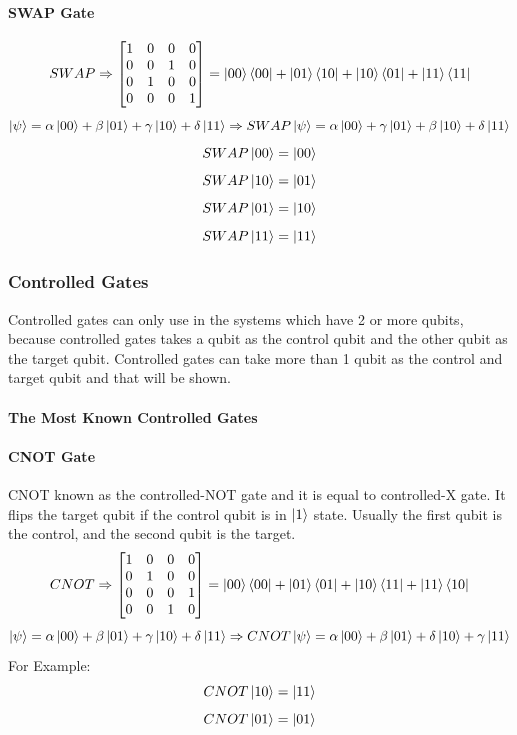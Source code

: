 \documentclass{article}
\begin{document}
\paragraph{SWAP Gate}
\begin{equation*}
    SWAP \Rightarrow \begin{bmatrix} 1 & 0 & 0 & 0 \\ 0 & 0 & 1 & 0 \\ 0 & 1 & 0 & 0 \\ 0 & 0 & 0 & 1 \end{bmatrix} = \ket{00}\bra{00}+\ket{01}\bra{10}+\ket{10}\bra{01}+\ket{11}\bra{11}
\end{equation*}
\begin{equation*}
    \ket{\psi} = \alpha\ket{00} + \beta\ket{01} + \gamma\ket{10} + \delta\ket{11} \Rightarrow SWAP\ket{\psi} = \alpha\ket{00} + \gamma\ket{01} + \beta\ket{10} + \delta\ket{11}
\end{equation*}
\vspace{0.5cm}
    $$SWAP\ket{00} = \ket{00}$$
    $$SWAP\ket{10} = \ket{01}$$
    $$SWAP\ket{01} = \ket{10}$$
    $$SWAP\ket{11} = \ket{11}$$
\subsubsection{Controlled Gates}
Controlled gates can only use in the systems which have 2 or more qubits, because controlled gates takes a qubit as the control qubit and the other qubit as the target qubit. Controlled gates can take more than 1 qubit as the control and target qubit and that will be shown.
\paragraph{The Most Known Controlled Gates}

\paragraph{CNOT Gate}
CNOT known as the controlled-NOT gate and it is equal to controlled-X gate. It flips the target qubit if the control qubit is in $\ket{1}$ state. Usually the first qubit is the control, and the second qubit is the target.
\begin{equation*}
    CNOT \Rightarrow \begin{bmatrix} 1 & 0 & 0 & 0 \\ 0 & 1 & 0 & 0 \\ 0 & 0 & 0 & 1 \\ 0 & 0 & 1 & 0 \end{bmatrix} = \ket{00}\bra{00}+\ket{01}\bra{01}+\ket{10}\bra{11}+\ket{11}\bra{10}
\end{equation*}
\begin{equation*}
        \ket{\psi} = \alpha\ket{00} + \beta\ket{01} + \gamma\ket{10} + \delta\ket{11} \Rightarrow CNOT\ket{\psi} = \alpha\ket{00} + \beta\ket{01} + \delta\ket{10} + \gamma\ket{11}
\end{equation*}
For Example: 
$$CNOT\ket{10} = \ket{11}$$
$$CNOT\ket{01} = \ket{01}$$
\end{document}
